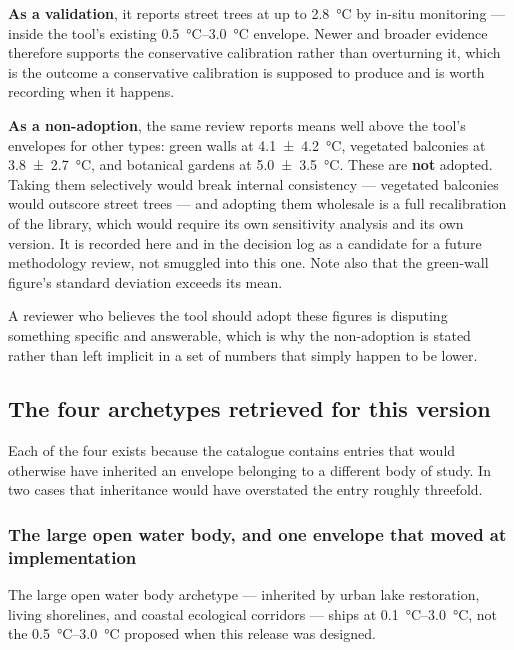 \textbf{As a validation}, it reports street trees at up to
\qty{2.8}{\degreeCelsius} by in-situ monitoring --- inside the tool's existing
\SIrange{0.5}{3.0}{\degreeCelsius} envelope. Newer and broader evidence
therefore supports the conservative calibration rather than overturning it,
which is the outcome a conservative calibration is supposed to produce and is
worth recording when it happens.

\textbf{As a non-adoption}, the same review reports means well above the tool's
envelopes for other types: green walls at
\qty{4.1(42)}{\degreeCelsius}, vegetated balconies at
\qty{3.8(27)}{\degreeCelsius}, and botanical gardens at
\qty{5.0(35)}{\degreeCelsius}. These are \textbf{not} adopted. Taking them
selectively would break internal consistency --- vegetated balconies would
outscore street trees --- and adopting them wholesale is a full recalibration of
the library, which would require its own sensitivity analysis and its own
version. It is recorded here and in the decision log as a candidate for a
future methodology review, not smuggled into this one. Note also that the
green-wall figure's standard deviation exceeds its mean.

A reviewer who believes the tool should adopt these figures is disputing
something specific and answerable, which is why the non-adoption is stated
rather than left implicit in a set of numbers that simply happen to be lower.

\subsection{The four archetypes retrieved for this version}
\label{sec:new-archetypes}

Each of the four exists because the catalogue contains entries that would
otherwise have inherited an envelope belonging to a different body of study. In
two cases that inheritance would have overstated the entry roughly threefold.

\subsubsection{The large open water body, and one envelope that moved at
implementation}
\label{sec:water-body}

The large open water body archetype --- inherited by urban lake restoration,
living shorelines, and coastal ecological corridors --- ships at
\SIrange{0.1}{3.0}{\degreeCelsius}, not the
\SIrange{0.5}{3.0}{\degreeCelsius} proposed when this release was designed.

